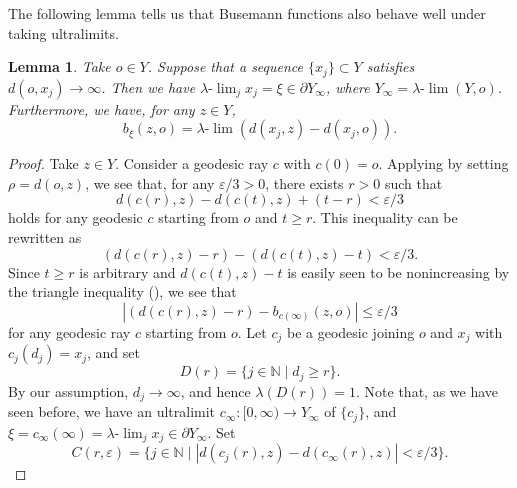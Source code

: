 \documentclass[12pt]{amsart}
\numberwithin{equation}{section}
\theoremstyle{plain}
\newtheorem{Lemma}[Theorem]{Lemma}
\theoremstyle{definition}
\theoremstyle{remark}
\newcommand{\N}{{\mathbb N}}
\newcommand{\ulim}{\lambda{\text{-}}\!\lim}
\newcommand{\ray}[1]{[#1)}
\begin{document}
%
%
The following lemma tells us that Busemann functions also behave
well under taking ultralimits. 

\begin{Lemma}
 \label{lem:ultralimit_of_buseman_fct}
 Take $o \in Y$. 
 Suppose that a sequence $\{x_j\} \subset Y$ satisfies
 $d(o,x_j)\to\infty$. 
 Then we have $\ulim_j x_j = \xi \in \partial Y_{\infty}$, where 
 $Y_{\infty}=\ulim (Y,o)$. 
 Furthermore,  we have, for any $z \in Y$, 
\begin{equation*}
 b_{\xi}(z,o)=\ulim \left(d(x_j,z)-d(x_j,o)\right). 
\end{equation*}
\end{Lemma}

\begin{proof}
 Take $z \in Y$.   
 Consider a geodesic ray $c$ with $c(0)=o$. 
 Applying \cite[p.~269, 8.21 Lemma]{bridson-haefliger} by setting
 $\rho=d(o,z)$, 
 we see that, for any $\varepsilon/3>0$, there exists $r>0$ such that
 \begin{equation*}
  d(c(r),z) -d(c(t),z) + (t-r) < \varepsilon/3
 \end{equation*}
 holds for any geodesic $c$ starting from $o$ and $t\geq r$.  
 This inequality can be rewritten as
 \begin{equation*}
  \left(d(c(r),z)-r\right) -
   \left(d(c(t),z)-t\right) < \varepsilon/3.
 \end{equation*}
 Since $t\geq r$ is arbitrary and $d(c(t),z)-t$ is easily seen to be
 nonincreasing by the triangle inequality 
 (\cite[p.~268, 8.18 Lemma (1)]{bridson-haefliger}),
 we see that
 \begin{equation*}
  |\left(d(c(r),z)-r\right) - b_{c(\infty)}(z, o)|
   \leq \varepsilon/3
 \end{equation*}
 for any geodesic ray $c$ starting from $o$. 
 Let $c_j$ be a geodesic joining $o$ and $x_j$ with $c_j(d_j)=x_j$, and
 set 
\begin{equation*}
  D(r)= \{j \in \N \mid d_j \geq r\}. 
\end{equation*}
 By our assumption, $d_j \to \infty$, and hence $\lambda(D(r))=1$. 
 Note that, as we have seen before, we have an ultralimit 
 $c_{\infty}\colon \ray{0,\infty}\rightarrow Y_{\infty}$ of $\{c_j\}$,
 and $\xi=c_{\infty}(\infty)=\ulim_j x_j \in \partial Y_{\infty}$. 
 Set
\begin{equation*}
  C(r,\varepsilon)  = \{j \in \N \mid 
   |d(c_j(r),z)-d(c_{\infty}(r),z)|
  < \varepsilon/3\}. 
\end{equation*}

\end{proof}
\end{document}
